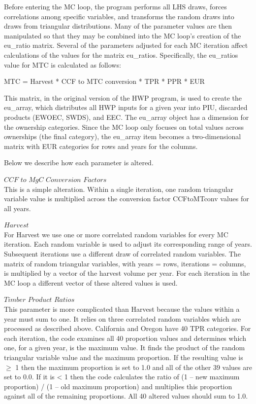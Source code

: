 \documentclass[
  openany]{book}
\begin{document}
Before entering the MC loop, the program performs all LHS draws, forces
correlations among specific variables, and transforms the random draws
into draws from triangular distributions. Many of the parameter values
are then manipulated so that they may be combined into the MC loop's
creation of the eu\_ratio matrix. Several of the parameters adjusted for
each MC iteration affect calculations of the values for the matrix
eu\_ratios. Specifically, the eu\_ratios value for MTC is calculated as
follows:

MTC = Harvest * CCF to MTC conversion * TPR * PPR * EUR

This matrix, in the original version of the HWP program, is used to
create the eu\_array, which distributes all HWP inputs for a given year
into PIU, discarded products (EWOEC, SWDS), and EEC. The eu\_array
object has a dimension for the ownership categories. Since the MC loop
only focuses on total values across ownerships (the final category), the
eu\_array item becomes a two-dimensional matrix with EUR categories for
rows and years for the columns.

Below we describe how each parameter is altered.

\(\textit{CCF to MgC Conversion Factors}\)\\
This is a simple alteration. Within a single iteration, one random
triangular variable value is multiplied across the conversion factor
CCFtoMTconv values for all years.

\(\textit{Harvest}\)\\
For Harvest we use one or more correlated random variables for every MC
iteration. Each random variable is used to adjust its corresponding
range of years. Subsequent iterations use a different draw of correlated
random variables. The matrix of random triangular variables, with years
= rows, iterations = columns, is multiplied by a vector of the harvest
volume per year. For each iteration in the MC loop a different vector of
these altered values is used.

\(\textit{Timber Product Ratios}\)\\
This parameter is more complicated than Harvest because the values
within a year must sum to one. It relies on three correlated random
variables which are processed as described above. California and Oregon
have 40 TPR categories. For each iteration, the code examines all 40
proportion values and determines which one, for a given year, is the
maximum value. It finds the product of the random triangular variable
value and the maximum proportion. If the resulting value is \(\geq\) 1
then the maximum proportion is set to 1.0 and all of the other 39 values
are set to 0.0. If it is \textless{} 1 then the code calculates the
ratio of (1 -- new maximum proportion) / (1 -- old maximum proportion)
and multiplies this proportion against all of the remaining proportions.
All 40 altered values should sum to 1.0.
\end{document}
